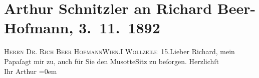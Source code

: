 

         
         \renewcommand{\erwaehntePersonen}{Personen: Richard Beer-Hofmann, Johann Schnitzler}
         \renewcommand{\erwaehnteOrte}{Orte: Bad Ischl, I., Innere Stadt, Wien, Wollzeile}
         \renewcommand{\erwaehnteWerke}{Werke: Musotte}
               \section[Arthur Schnitzler an Richard Beer-Hofmann, 3. 11. 1892]{ Arthur Schnitzler an Richard Beer-Hofmann, 3. 11. 1892}\nopagebreak{}\rehead{ }\begin{ledgroupsized}[t]{13cm}\normalsize\beginnumbering \toendnotes[C]{\smallbreak\pagebreak[2]} 
\pstart{}{\pb}\textsc{Herrn Dr. Rich Beer Hofmann}\pend{}\pstart{}\textsc{Wien.}\pend{}\pstart{}\textsc{I Wollzeile 15}.\pend{}{\bigskip}\pstart{}{\pb}Lieber Richard, \pend\pstart
           mein Papaſagt mir zu, auch für Sie den MusotteSitz zu beſorgen.\pend
           \pstart
           Herzlichſt{\\[\baselineskip]} Ihr \spacefill\mbox{Arthur}\pend
           \leftskip=0em{}
         
         \endnumbering{}\end{ledgroupsized}  \newcommand{\dateiname}{L00131}\newcommand{\titel}{Arthur Schnitzler an Richard Beer-Hofmann, 3. 11. 1892}\newcommand{\editorInnen}{Martin Anton Müller und Gerd-Hermann Susen}
      